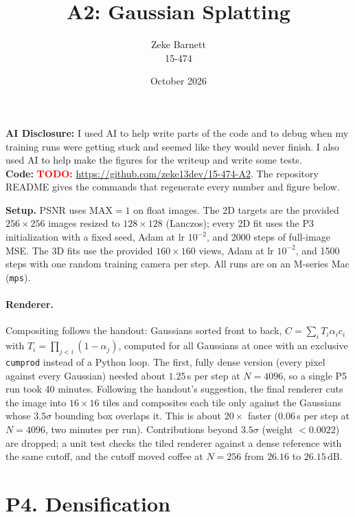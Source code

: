 \documentclass[11pt]{article}
\title{A2: Gaussian Splatting}
\author{Zeke Barnett \\ 15-474}
\date{October 2026}
\newcommand{\code}[1]{\texttt{#1}}
\newcommand{\dB}{\,\mathrm{dB}}
\newcommand{\todo}[1]{\textcolor{red}{\textbf{TODO:} #1}}
\begin{document}
\maketitle

\noindent\textbf{AI Disclosure:} I used AI to help write parts of the code and to debug when my training runs were getting stuck and seemed like they would never finish. I also used AI to help make the figures for the writeup and write some tests. \\

\noindent\textbf{Code:} \todo{\url{https://github.com/zeke13dev/15-474-A2}}. The repository README gives the commands that regenerate every number and figure below.

\medskip
\noindent\textbf{Setup.} PSNR uses $\mathrm{MAX}=1$ on float images. The 2D targets are the provided $256\times256$ images resized to $128\times128$ (Lanczos); every 2D fit uses the P3 initialization with a fixed seed, Adam at lr $10^{-2}$, and 2000 steps of full-image MSE. The 3D fits use the provided $160\times160$ views, Adam at lr $10^{-2}$, and 1500 steps with one random training camera per step. All runs are on an M-series Mac (\code{mps}).

\paragraph{Renderer.} Compositing follows the handout: Gaussians sorted front to back, $C=\sum_i T_i\alpha_i c_i$ with $T_i=\prod_{j<i}(1-\alpha_j)$, computed for all Gaussians at once with an exclusive \code{cumprod} instead of a Python loop. The first, fully dense version (every pixel against every Gaussian) needed about $1.25$\,s per step at $N=4096$, so a single P5 run took 40 minutes. Following the handout's suggestion, the final renderer cuts the image into $16\times16$ tiles and composites each tile only against the Gaussians whose $3.5\sigma$ bounding box overlaps it. This is about $20\times$ faster ($0.06$\,s per step at $N=4096$, two minutes per run). Contributions beyond $3.5\sigma$ (weight $<0.0022$) are dropped; a unit test checks the tiled renderer against a dense reference with the same cutoff, and the cutoff moved coffee at $N=256$ from $26.16$ to $26.15\dB$.

\section*{P4. Densification}
\end{document}

